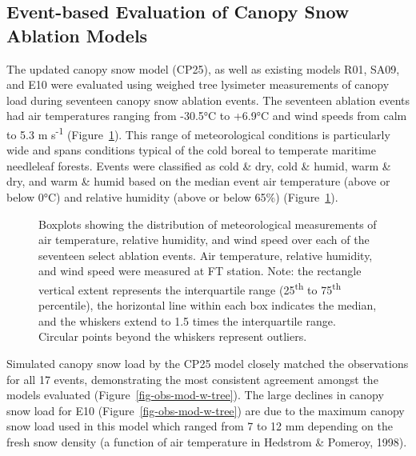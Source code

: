 \documentclass[
]{agujournal2019}
\begin{document}
\subsection{Event-based Evaluation of Canopy Snow Ablation
Models}\label{event-based-evaluation-of-canopy-snow-ablation-models}

The updated canopy snow model (CP25), as well as existing models R01,
SA09, and E10 were evaluated using weighed tree lysimeter measurements
of canopy load during seventeen canopy snow ablation events. The
seventeen ablation events had air temperatures ranging from -30.5°C to
+6.9°C and wind speeds from calm to 5.3 m s\textsuperscript{-1}
(Figure~\ref{fig-event-met-boxplot}). This range of meteorological
conditions is particularly wide and spans conditions typical of the cold
boreal to temperate maritime needleleaf forests. Events were classified
as cold \& dry, cold \& humid, warm \& dry, and warm \& humid based on
the median event air temperature (above or below 0°C) and relative
humidity (above or below 65\%) (Figure~\ref{fig-event-met-boxplot}).

\begin{figure}[htbp]


\caption{\label{fig-event-met-boxplot}Boxplots showing the distribution
of meteorological measurements of air temperature, relative humidity,
and wind speed over each of the seventeen select ablation events. Air
temperature, relative humidity, and wind speed were measured at FT
station. Note: the rectangle vertical extent represents the
interquartile range (25\textsuperscript{th} to 75\textsuperscript{th}
percentile), the horizontal line within each box indicates the median,
and the whiskers extend to 1.5 times the interquartile range. Circular
points beyond the whiskers represent outliers.}

\end{figure}%

Simulated canopy snow load by the CP25 model closely matched the
observations for all 17 events, demonstrating the most consistent
agreement amongst the models evaluated
(Figure~\ref{fig-obs-mod-w-tree}). The large declines in canopy snow
load for E10 (Figure~\ref{fig-obs-mod-w-tree}) are due to the maximum
canopy snow load used in this model which ranged from 7 to 12 mm
depending on the fresh snow density (a function of air temperature in
Hedstrom \& Pomeroy, 1998).
\end{document}
